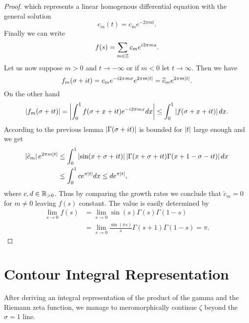 \begin{proof}
	which represents a linear homogenous differential equation with the general solution
\begin{equation*}
	c_m(t) = c_m e^{-2 \pi m t}.
\end{equation*}
	Finally we can write
\begin{equation*}
	f(s) = \sum _{m \in \mathbb{Z}} c_m e^{i 2 \pi m s}.
\end{equation*}
	Let us now suppose $m > 0$ and $t \to -\infty$ or if $m < 0$ let $t \to \infty$. Then we have
\begin{equation*}
	f_m(\sigma + i t) = c_m e^{-i 2 \pi m \sigma} e^{2 \pi m \left|t\right|} = \widetilde{c}_m e^{2 \pi m \left|t\right|}.
\end{equation*}
	On the other hand
\begin{equation*}
	\left|f_m(\sigma + i t)\right| = \left|\int _0 ^1 f(\sigma + x + i t) e^{- i 2 \pi m x} dx\right| \leq \int _0 ^1 \left|f(\sigma + x + i t)\right| dx.
\end{equation*}
	According to the previous lemma  $\left|\Gamma(\sigma + i t)\right|$ is bounded for $\left|t\right|$ large enough and we get
\begin{equation*}
\begin{aligned}
	\left|\widetilde{c}_m\right| e^{2 \pi m \left|t\right|}
	&\leq \int_0^1 \left|\sin(x + \sigma + i t)\right| \left|\Gamma(x + \sigma + i t) \Gamma(x + 1 - \sigma - i t)\right| dx \\
	&\leq \int_0^1 c e^{\pi \left|t\right|} dx
	\leq d e^{\pi \left|t\right|},
\end{aligned}
\end{equation*}
	where $c,d \in \mathbb{R}_{> 0}$. Thus by comparing the growth rates we conclude that $\widetilde{c}_m = 0$ for $m \neq 0$ leaving $f(s)$ constant. The value is easily determined by
\begin{equation*}
\begin{aligned}
	\lim\limits_{s \to 0} f(s)
	&= \lim\limits_{s \to 0} \sin(s) \Gamma(s) \Gamma(1 - s) \\
	&= \lim\limits_{s \to 0} \frac{\sin(\pi s)}{s} \Gamma(s + 1) \Gamma(1 - s)
	= \pi.
\end{aligned}	
\end{equation*}
\end{proof}


\section{Contour Integral Representation}
After deriving an integral representation of the product of the gamma and the Riemann zeta function, we manage to meromorphically continue $\zeta$ beyond the $\sigma = 1$ line.


